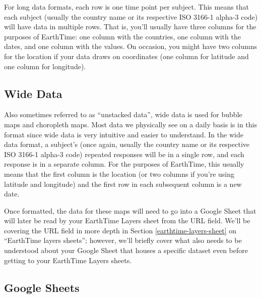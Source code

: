 \documentclass[
  12pt,
]{krantz}
\begin{document}
For long data formats, each row is one time point per subject. This means that each subject (usually the country name or its respective ISO 3166-1 alpha-3 code) will have data in multiple rows. That is, you'll usually have three columns for the purposes of EarthTime: one column with the countries, one column with the dates, and one column with the values. On occasion, you might have two columns for the location if your data draws on coordinates (one column for latitude and one column for longitude).

\hypertarget{wide-data}{%
\subsection{Wide Data}\label{wide-data}}

Also sometimes referred to as ``unstacked data'', wide data is used for bubble maps and choropleth maps. Most data we physically see on a daily basis is in this format since wide data is very intuitive and easier to understand. In the wide data format, a subject's (once again, usually the country name or its respective ISO 3166-1 alpha-3 code) repeated responses will be in a single row, and each response is in a separate column. For the purposes of EarthTime, this usually means that the first column is the location (or two columns if you're using latitude and longitude) and the first row in each subsequent column is a new date.

Once formatted, the data for these maps will need to go into a Google Sheet that will later be read by your EarthTime Layers sheet from the URL field. We'll be covering the URL field in more depth in Section \ref{earthtime-layers-sheet} on ``EarthTime layers sheets''; however, we'll briefly cover what also needs to be understood about your Google Sheet that houses a specific dataset even before getting to your EarthTime Layers sheets.

\hypertarget{google-sheets}{%
\subsection{Google Sheets}\label{google-sheets}}
\end{document}
